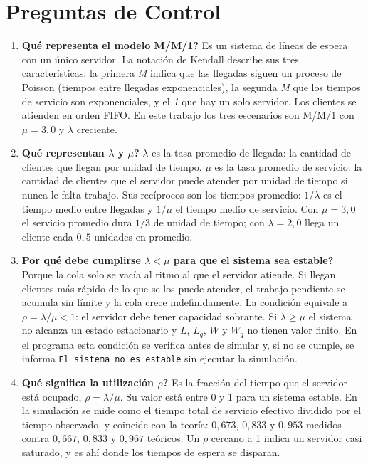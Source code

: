 \documentclass[11pt,a4paper]{article}
\begin{document}
\section{Preguntas de Control}

\begin{enumerate}
    \item \textbf{\textquestiondown{}Qué representa el modelo M/M/1?}
    Es un sistema de líneas de espera con un único servidor. La notación de Kendall
    describe sus tres características: la primera \emph{M} indica que las llegadas
    siguen un proceso de Poisson (tiempos entre llegadas exponenciales), la segunda
    \emph{M} que los tiempos de servicio son exponenciales, y el \emph{1} que hay un
    solo servidor. Los clientes se atienden en orden FIFO. En este trabajo los tres
    escenarios son M/M/1 con $\mu = 3{,}0$ y $\lambda$ creciente.

    \item \textbf{\textquestiondown{}Qué representan $\lambda$ y $\mu$?}
    $\lambda$ es la tasa promedio de llegada: la cantidad de clientes que llegan por
    unidad de tiempo. $\mu$ es la tasa promedio de servicio: la cantidad de clientes que
    el servidor puede atender por unidad de tiempo si nunca le falta trabajo. Sus
    recíprocos son los tiempos promedio: $1/\lambda$ es el tiempo medio entre llegadas y
    $1/\mu$ el tiempo medio de servicio. Con $\mu = 3{,}0$ el servicio promedio dura
    $1/3$ de unidad de tiempo; con $\lambda = 2{,}0$ llega un cliente cada $0{,}5$
    unidades en promedio.

    \item \textbf{\textquestiondown{}Por qué debe cumplirse $\lambda < \mu$ para que el sistema sea estable?}
    Porque la cola solo se vacía al ritmo al que el servidor atiende. Si llegan clientes
    más rápido de lo que se los puede atender, el trabajo pendiente se acumula sin
    límite y la cola crece indefinidamente. La condición equivale a $\rho = \lambda/\mu <
    1$: el servidor debe tener capacidad sobrante. Si $\lambda \geq \mu$ el sistema no
    alcanza un estado estacionario y $L$, $L_q$, $W$ y $W_q$ no tienen valor finito. En
    el programa esta condición se verifica antes de simular y, si no se cumple, se
    informa \texttt{El sistema no es estable} sin ejecutar la simulación.

    \item \textbf{\textquestiondown{}Qué significa la utilización $\rho$?}
    Es la fracción del tiempo que el servidor está ocupado, $\rho = \lambda/\mu$. Su
    valor está entre 0 y 1 para un sistema estable. En la simulación se mide como el
    tiempo total de servicio efectivo dividido por el tiempo observado, y coincide con la
    teoría: $0{,}673$, $0{,}833$ y $0{,}953$ medidos contra $0{,}667$, $0{,}833$ y
    $0{,}967$ teóricos. Un $\rho$ cercano a 1 indica un servidor casi saturado, y es ahí
    donde los tiempos de espera se disparan.


\end{enumerate}
\end{document}
